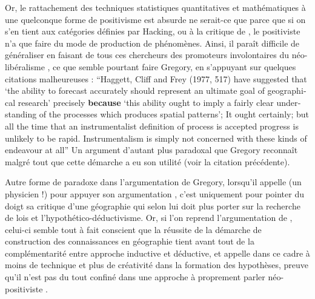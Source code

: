 Or, le rattachement des techniques statistiques quantitatives et mathématiques à une quelconque forme de positivisme est absurde ne serait-ce que parce que si on s'en tient aux catégories définies par Hacking, ou à la critique de \autocite{Dauphine2003}, le positiviste n'a que faire du mode de production de phénomènes. Ainsi, il paraît difficile de généraliser en faisant de tous ces chercheurs des promoteurs involontaires du néo-libéralisme \autocite[61-64]{Paterson1984}, ce que semble pourtant faire Gregory, en s'appuyant sur quelques citations malheureuses : \foreignquote{english}{Haggett, Cliff and Frey (1977, 517) have suggested that \foreignquote{english}{the ability to forecast accurately should represent an ultimate goal of geographical research} precisely \textbf{because} \foreignquote{english}{this ability ought to imply a fairly clear understanding of the processes which produces spatial patterns}; It ought certainly; but all the time that an instrumentalist definition of process is accepted progress is unlikely to be rapid. Instrumentalism is simply not concerned with these kinds of endeavour at all} \autocite[41]{Gregory1978} Un argument d'autant plus paradoxal que Gregory reconnaît malgré tout que cette démarche a eu son utilité (voir la citation précédente).


Autre forme de paradoxe dans l'argumentation de Gregory, lorsqu'il appelle \textcite{Wilson1972} (un physicien !) pour appuyer son argumentation \autocite{Gregory1978}, c'est uniquement pour pointer du doigt sa critique d'une géographie qui selon lui doit plus porter sur la recherche de lois et l'hypothético-déductivisme. Or, si l'on reprend l'argumentation de \textcite{Wilson1972}, celui-ci semble tout à fait conscient que la réussite de la démarche de construction des connaissances en géographie tient avant tout de la complémentarité entre approche inductive et déductive, et appelle dans ce cadre à moins de technique et plus de créativité dans la formation des hypothèses, preuve qu'il n'est pas du tout confiné dans une approche à proprement parler néo-positiviste .

